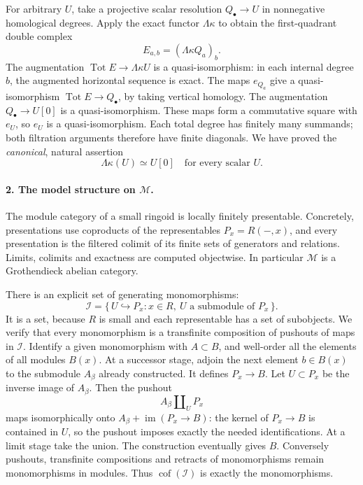 For arbitrary \(U\), take a projective scalar resolution
\(Q_\bullet\to U\) in nonnegative homological degrees.
Apply the exact functor \(\Lambda\kappa\) to obtain the
first-quadrant double complex
\[
 E_{a,b}=(\Lambda\kappa Q_a)_b.
\]
The augmentation
\(\operatorname{Tot}E\to\Lambda\kappa U\) is a quasi-isomorphism:
in each internal degree \(b\), the augmented horizontal sequence
is exact.  The maps \(e_{Q_a}\) give a quasi-isomorphism
\(\operatorname{Tot}E\to Q_\bullet\), by taking vertical homology.
The augmentation \(Q_\bullet\to U[0]\) is a quasi-isomorphism.
These maps form a commutative square with \(e_U\), so \(e_U\)
is a quasi-isomorphism.  Each total degree has finitely many
summands; both filtration arguments therefore have finite
diagonals.  We have proved the \emph{canonical}, natural assertion
\[
 \Lambda\kappa(U)\simeq U[0]\quad\text{for every scalar }U.
 \tag{SM29.3}
\]

\paragraph{2. The model structure on \(\mathcal M\).}
The module category of a small ringoid is locally finitely
presentable.  Concretely, presentations use coproducts of the
representables \(P_x=R(-,x)\), and every presentation is the filtered
colimit of its finite sets of generators and relations.  Limits,
colimits and exactness are computed objectwise.
In particular \(\mathcal M\) is a Grothendieck abelian category.

There is an explicit set of generating monomorphisms:
\[
 \mathcal I=\{\,U\hookrightarrow P_x:
       x\in R,\ U\text{ a submodule of }P_x\,\}.
 \tag{SM29.4}
\]
It is a set, because \(R\) is small and each representable has a
set of subobjects.  We verify that every monomorphism is a
transfinite composition of pushouts of maps in \(\mathcal I\).
Identify a given monomorphism with \(A\subset B\), and well-order
all the elements of all modules \(B(x)\).  At a successor stage,
adjoin the next element \(b\in B(x)\) to the submodule \(A_\beta\)
already constructed.  It defines \(P_x\to B\).  Let
\(U\subset P_x\) be the inverse image of \(A_\beta\).
Then the pushout
\[
 A_\beta\amalg_U P_x
\]
maps isomorphically onto \(A_\beta+\operatorname{im}(P_x\to B)\):
the kernel of \(P_x\to B\) is contained in \(U\), so the pushout
imposes exactly the needed identifications.  At a limit stage
take the union.  The construction eventually gives \(B\).
Conversely pushouts, transfinite compositions and retracts of
monomorphisms remain monomorphisms in modules.  Thus
\(\operatorname{cof}(\mathcal I)\) is exactly the monomorphisms.

